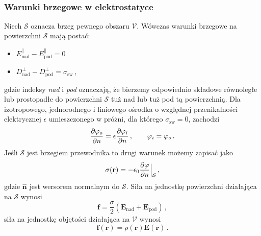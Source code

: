 \documentclass[../main.tex]{subfiles}
\begin{document}
\noindent{}\\
\subsubsection{Warunki brzegowe w elektrostatyce}
Niech \(\mathcal{S}\) oznacza brzeg pewnego obszaru \(\mathcal{V}\). Wówczas warunki brzegowe na powierzchni \(\mathcal{S}\) mają postać:
\begin{itemize}
    \item \(E_\text{nad}^\parallel-E_\text{pod}^\parallel=0\)
    \item \(D_\text{nad}^\perp-D_\text{pod}^\perp=\sigma_\text{sw}\)\,,
\end{itemize}
gdzie indeksy \textit{nad} i \textit{pod} oznaczają, że bierzemy odpowiednio składowe równoległe lub prostopadłe do powierzchni \(\mathcal{S}\) tuż nad lub tuż pod tą powierzchnią. Dla izotropowego, jednorodnego i liniowego ośrodka o względnej przenikalności elektrycznej \(\epsilon\) umieszczonego w próżni, dla którego \(\sigma_\text{sw}=0\), zachodzi
\begin{equation*}
    \pdv{\varphi_o}{n}=\epsilon\pdv{\varphi_i}{n}\,,\quad\quad \varphi_i=\varphi_o\,.
\end{equation*}
Jeśli \(\mathcal{S}\) jest brzegiem przewodnika to drugi warunek możemy zapisać jako
\begin{equation*}
    \sigma(\mathbf{r})=-\epsilon_0\pdv{\varphi}{n}\Big|_\mathcal{S}\,,
\end{equation*}
gdzie \(\mathbf{\hat{n}}\) jest wersorem normalnym do \(\mathcal{S}\). Siła na jednostkę powierzchni działająca na \(\mathcal{S}\) wynosi
\begin{equation*}
    \mathbf{f}=\frac{\sigma}{2}(\mathbf{E}_\text{nad}+\mathbf{E}_\text{pod})\,,
\end{equation*}
siła na jednostkę objętości działająca na \(\mathcal{V}\) wynosi
\begin{equation*}
    \mathbf{f}(\mathbf{r})=\rho(\mathbf{r})\mathbf{E}(\mathbf{r})\,.
\end{equation*}
\end{document}

